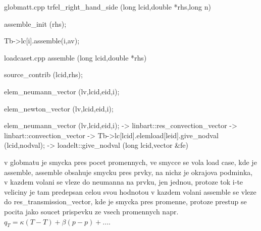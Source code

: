 globmatt.cpp trfel\_right\_hand\_side (long lcid,double *rhs,long n)


assemble\_init (rhs);

Tb->lc[i].assemble(i,av);


loadcaset.cpp assemble (long lcid,double *rhs)

  source\_contrib (lcid,rhs);

      elem\_neumann\_vector (lv,lcid,eid,i);



      elem\_newton\_vector (lv,lcid,eid,i);

     elem\_neumann\_vector (lv,lcid,eid,i); -> linbart::res\_convection\_vector -> linbart::convection\_vector ->   Tb->lc[lcid].elemload[leid].give\_nodval (lcid,nodval);
-> loadelt::give\_nodval (long lcid,vector \&fe)


v globmatu je smycka pres pocet promennych, 
ve smycce se vola load case, kde je assemble,
assemble obsahuje smycku pres prvky, na nichz je okrajova podminka,
v kazdem volani se vleze do neumanna na prvku, jen jednou, protoze
tok i-te veliciny je tam predepsan celou svou hodnotou
v kazdem volani assemble se vleze do res\_transmission\_vector, kde
je smycka pres promenne, protoze prestup se pocita jako soucet
prispevku ze vsech promennych
napr. $q_T = \kappa (T-T) + \beta (p-p) + ...$.